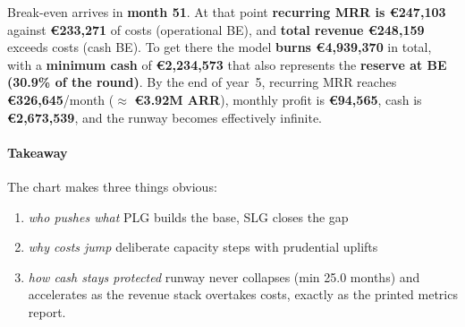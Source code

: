 
Break-even arrives in \textbf{month 51}. At that point \textbf{recurring MRR is €247{,}103} against \textbf{€233{,}271} of costs (operational BE), and \textbf{total revenue €248{,}159} exceeds costs (cash BE). To get there the model \textbf{burns €4{,}939{,}370} in total, with a \textbf{minimum cash} of \textbf{€2{,}234{,}573} that also represents the \textbf{reserve at BE (30.9\% of the round)}. By the end of year~5, recurring MRR reaches \textbf{€326{,}645}/month ($\approx$ \textbf{€3.92M ARR}), monthly profit is \textbf{€94{,}565}, cash is \textbf{€2{,}673{,}539}, and the runway becomes effectively infinite.

\paragraph{Takeaway}
The chart makes three things obvious:
\begin{enumerate}
\item \emph{who pushes what} PLG builds the base, SLG closes the gap
\item \emph{why costs jump} deliberate capacity steps with prudential uplifts
\item \emph{how cash stays protected} runway never collapses (min 25.0 months) and accelerates as the revenue stack overtakes costs, exactly as the printed metrics report.
\end{enumerate}

\begin{table}[H]
\centering
\caption{Financial Projection Summary (Year-End)}
\label{tab:financial_summary}
\end{table}

